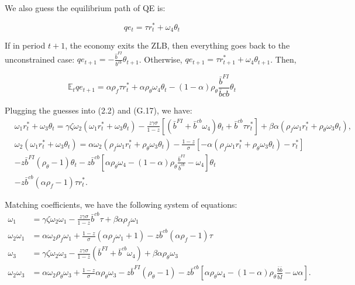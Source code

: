 \documentclass[10pt]{article}
\begin{document}
We also guess the equilibrium path of QE is:

\begin{equation*}
q e_{t}=\tau r_{t}^{*}+\omega_{4} \theta_{t}
\end{equation*}

If in period $t+1$, the economy exits the ZLB, then everything goes back to the unconstrained case: $q e_{t+1}=-\frac{\hat{b}^{F I}}{b^{c b}} \theta_{t+1}$. Otherwise, $q e_{t+1}=\tau r_{t+1}^{*}+\omega_{4} \theta_{t+1}$. Then,

\begin{equation*}
\mathbb{E}_{t} q e_{t+1}=\alpha \rho_{f} \tau r_{t}^{*}+\alpha \rho_{\theta} \omega_{4} \theta_{t}-(1-\alpha) \rho_{\theta} \frac{\bar{b}^{F I}}{\bar{b} c b} \theta_{t}
\end{equation*}

Plugging the guesses into (2.2) and (G.17), we have:\\
\begin{align*}
& \omega_{1} r_{t}^{*}+\omega_{3} \theta_{t}=\gamma \zeta \omega_{2}\left(\omega_{1} r_{t}^{*}+\omega_{3} \theta_{t}\right)-\frac{z \gamma \sigma}{1-z}\left[\left(\bar{b}^{F I}+\bar{b}^{c b} \omega_{4}\right) \theta_{t}+\bar{b}^{c b} \tau r_{t}^{*}\right]+\beta \alpha\left(\rho_{f} \omega_{1} r_{t}^{*}+\rho_{\theta} \omega_{3} \theta_{t}\right),  \tag{G.18}\\
& \omega_{2}\left(\omega_{1} r_{t}^{*}+\omega_{3} \theta_{t}\right)=\alpha \omega_{2}\left(\rho_{f} \omega_{1} r_{t}^{*}+\rho_{\theta} \omega_{3} \theta_{t}\right)-\frac{1-z}{\sigma}\left[-\alpha\left(\rho_{f} \omega_{1} r_{t}^{*}+\rho_{\theta} \omega_{3} \theta_{t}\right)-r_{t}^{*}\right] \\
& -z \bar{b}^{F I}\left(\rho_{\theta}-1\right) \theta_{t}-z \bar{b}^{c b}\left[\alpha \rho_{\theta} \omega_{4}-(1-\alpha) \rho_{\theta} \frac{\bar{b}^{F I}}{\bar{b}^{c b}}-\omega_{4}\right] \theta_{t} \\
& -z \bar{b}^{c b}\left(\alpha \rho_{f}-1\right) \tau r_{t}^{*} . \tag{G.19}
\end{align*}

Matching coefficients, we have the following system of equations:\\
\begin{align*}
\omega_{1} & =\gamma \zeta \omega_{2} \omega_{1}-\frac{z \gamma \sigma}{1-z} \bar{b}^{c b} \tau+\beta \alpha \rho_{f} \omega_{1}  \tag{G.20}\\
\omega_{2} \omega_{1} & =\alpha \omega_{2} \rho_{f} \omega_{1}+\frac{1-z}{\sigma}\left(\alpha \rho_{f} \omega_{1}+1\right)-z \bar{b}^{c b}\left(\alpha \rho_{f}-1\right) \tau  \tag{G.21}\\
\omega_{3} & =\gamma \zeta \omega_{2} \omega_{3}-\frac{z \gamma \sigma}{1-z}\left(\bar{b}^{F I}+\bar{b}^{c b} \omega_{4}\right)+\beta \alpha \rho_{\theta} \omega_{3}  \tag{G.22}\\
\omega_{2} \omega_{3} & =\alpha \omega_{2} \rho_{\theta} \omega_{3}+\frac{1-z}{\sigma} \alpha \rho_{\theta} \omega_{3}-z \bar{b}^{F I}\left(\rho_{\theta}-1\right)-z \bar{b}^{c b}\left[\alpha \rho_{\theta} \omega_{4}-(1-\alpha) \rho_{\theta} \frac{\bar{b} \bar{b}}{\overline{b I}}-\omega \alpha\right] . \tag{23}
\end{align*}
\end{document}
